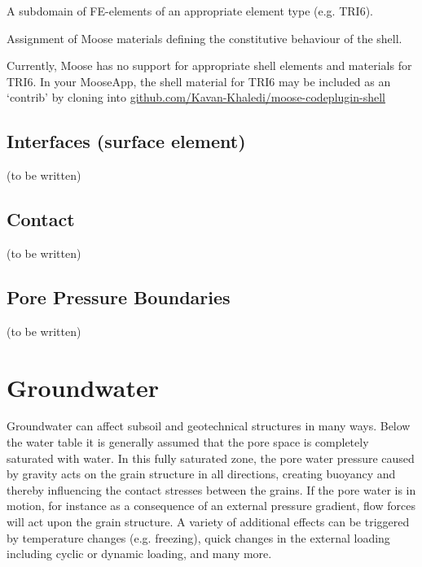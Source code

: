 \begin{description}[font=$\bullet$~\normalfont]
  \item [subdomain:] A subdomain of FE-elements of an appropriate element type (e.g. TRI6).
  \item [materials:] Assignment of Moose materials defining the constitutive behaviour of the shell.
\end{description}

Currently, Moose has no support for appropriate shell elements and materials
for TRI6. In your MooseApp, the shell material for TRI6 may be included as an
‘contrib’ by cloning into
\href{https://github.com/Kavan-Khaledi/moose-codeplugin-shell}{github.com/Kavan-Khaledi/moose-codeplugin-shell}

\subsection{Interfaces (surface element)}

(to be written)

\subsection{Contact}

(to be written)

\subsection{Pore Pressure Boundaries}

(to be written)

\section{Groundwater}
\label{chap:entities-groundwater}

Groundwater can affect subsoil and geotechnical structures in many ways. Below
the water table it is generally assumed that the pore space is completely
saturated with water. In this fully saturated zone, the pore water pressure
caused by gravity acts on the grain structure in all directions, creating
buoyancy and thereby influencing the contact stresses between the grains. If
the pore water is in motion, for instance as a consequence of an external
pressure gradient, flow forces will act upon the grain structure. A variety of
additional effects can be triggered by temperature changes (e.g. freezing),
quick changes in the external loading including cyclic or dynamic loading, and
many more.


